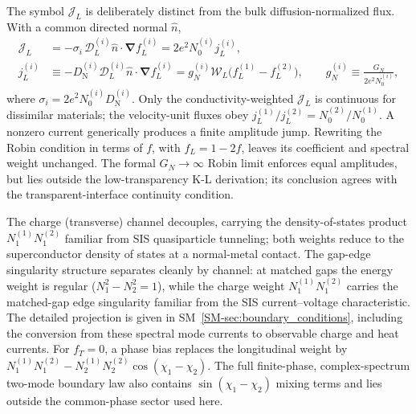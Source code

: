 \documentclass[
  aps,
  prb,
  preprint,
  superscriptaddress,
  longbibliography,
  nofootinbib
]{revtex4-2}
\newcommand{\bnabla}{\boldsymbol{\nabla}}
\newcommand{\DOS}{N_1}
\newcommand{\DN}{D_{\mathrm{N}}}
\newcommand{\fL}{f_L}
\newcommand{\fT}{f_T}
\begin{document}
The symbol \(\mathcal J_L\) is deliberately distinct from the bulk
diffusion-normalized flux. With a common directed normal \(\hat n\),
\begin{align}
  \mathcal J_L
  &=
  -\sigma_i\,\mathcal D_L^{(i)}
  \hat n\!\cdot\!\bnabla\fL^{(i)}
  =
  2e^2N_0^{(i)}j_L^{(i)},\\
  j_L^{(i)}
  &\equiv
  -\DN^{(i)}\mathcal D_L^{(i)}
  \hat n\!\cdot\!\bnabla\fL^{(i)}
  =
  g_N^{(i)}\mathcal W_L
  \bigl(\fL^{(1)}-\fL^{(2)}\bigr),
  \qquad
  g_N^{(i)}\equiv\frac{G_N}{2e^2N_0^{(i)}} ,
  \label{eq:KL_normalization_bridge}
\end{align}
where \(\sigma_i=2e^2N_0^{(i)}\DN^{(i)}\).
Only the conductivity-weighted \(\mathcal J_L\) is continuous for
dissimilar materials; the velocity-unit fluxes obey
\(j_L^{(1)}/j_L^{(2)}=N_0^{(2)}/N_0^{(1)}\).
A nonzero current generically produces a finite amplitude jump. Rewriting
the Robin condition in terms of \(f\), with \(\fL=1-2f\), leaves its
coefficient and spectral weight unchanged. The formal
\(G_N\to\infty\) Robin limit enforces equal amplitudes, but lies outside the
low-transparency K-L derivation; its conclusion agrees with the
transparent-interface continuity condition.

The charge (transverse) channel decouples, carrying the density-of-states
product \(\DOS^{(1)}\DOS^{(2)}\) familiar from SIS quasiparticle tunneling;
both weights reduce to the superconductor density of states at a
normal-metal contact. The gap-edge singularity structure separates cleanly
by channel: at matched gaps the energy weight is regular
(\(\DOS^2-N_2^2=1\)), while the charge weight \(\DOS^{(1)}\DOS^{(2)}\)
carries the matched-gap edge singularity familiar from the SIS
current--voltage characteristic. The detailed projection is given in
SM~\cref{SM-sec:boundary_conditions}, including the conversion from these
spectral mode currents to observable charge and heat currents.
For \(\fT=0\), a phase bias replaces the longitudinal weight by
\(\DOS^{(1)}\DOS^{(2)}
-N_2^{(1)}N_2^{(2)}\cos(\chi_1-\chi_2)\). The full finite-phase,
complex-spectrum two-mode boundary law also contains
\(\sin(\chi_1-\chi_2)\) mixing terms and lies outside the common-phase
sector used here.
\end{document}
